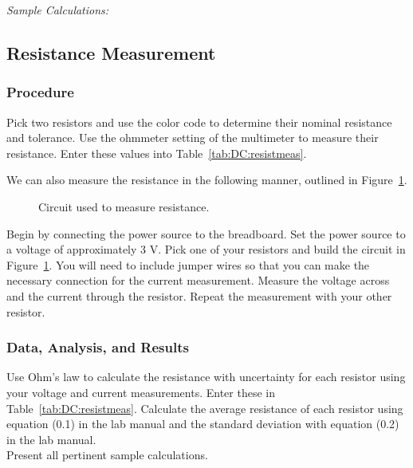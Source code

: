 {\it Sample Calculations:}

\vspace*{2cm}


\subsection{Resistance Measurement}
\subsubsection{Procedure}

Pick two resistors and use the color code to determine their nominal resistance
and tolerance. Use the ohmmeter setting of the multimeter to measure their
resistance. Enter these values into Table~\ref{tab:DC:resistmeas}.

We can also measure the resistance in the following manner, outlined
in Figure~\ref{fig:DC:procresist}.  
\begin{figure}
\centerline{\epsfxsize=6cm }
\caption{Circuit used to measure resistance.}
\label{fig:DC:procresist}
\end{figure}
Begin by connecting the power source to 
the breadboard. Set the power source to a voltage of approximately 3 V. Pick 
one of your resistors and build the circuit in Figure~\ref{fig:DC:procresist}. 
You will need to include jumper wires so that you can make the necessary 
connection for the current measurement.  Measure the voltage across and the 
current through the resistor.  Repeat the measurement with your other resistor.  

\subsubsection{Data, Analysis, and Results}
Use Ohm's law to calculate the resistance with uncertainty for each resistor
using your voltage and current measurements. Enter these in
Table~\ref{tab:DC:resistmeas}. 
Calculate the average resistance of each resistor using 
equation (0.1) in the lab manual and the standard deviation with 
equation (0.2) in the lab manual. \\  

\noindent
Present all pertinent sample calculations.
\indent
\newpage

